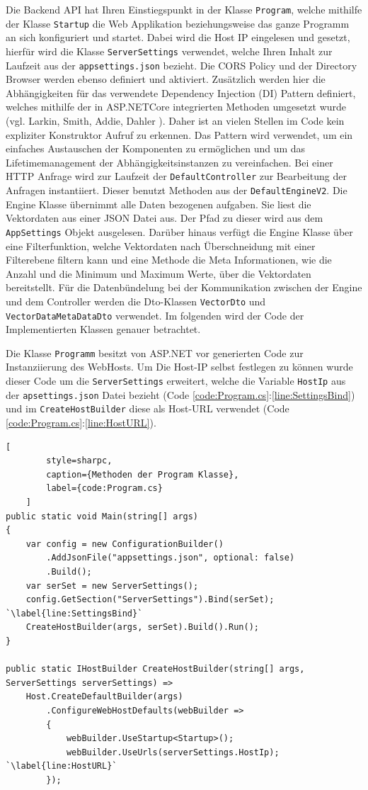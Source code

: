 Die Backend API hat Ihren Einstiegspunkt in der Klasse \texttt{Program}, welche mithilfe der Klasse \texttt{Startup} die Web Applikation beziehungsweise das ganze Programm an sich konfiguriert und startet. Dabei wird die Host IP eingelesen und gesetzt, hierfür wird die Klasse \texttt{ServerSettings} verwendet, welche Ihren Inhalt zur Laufzeit aus der \texttt{appsettings.json} bezieht. Die CORS Policy und der Directory Browser werden ebenso definiert und aktiviert. Zusätzlich werden hier die Abhängigkeiten für das verwendete Dependency Injection (DI) Pattern definiert, welches mithilfe der in ASP.NETCore integrierten Methoden umgesetzt wurde (vgl. Larkin, Smith, Addie, Dahler \cite{Dependen80:online}). Daher ist an vielen Stellen im Code kein expliziter Konstruktor Aufruf zu erkennen. Das Pattern wird verwendet, um ein einfaches Austauschen der Komponenten zu ermöglichen und um das Lifetimemanagement der Abhängigkeitsinstanzen zu vereinfachen. Bei einer HTTP Anfrage wird zur Laufzeit der \texttt{DefaultController} zur Bearbeitung der Anfragen instantiiert. Dieser benutzt Methoden aus der \texttt{DefaultEngineV2}. Die Engine Klasse übernimmt alle Daten bezogenen aufgaben. Sie liest die Vektordaten aus einer JSON Datei aus. Der Pfad zu dieser wird aus dem \texttt{AppSettings} Objekt ausgelesen. Darüber hinaus verfügt die Engine Klasse über eine Filterfunktion, welche Vektordaten nach Überschneidung mit einer Filterebene filtern kann und eine Methode die Meta Informationen, wie die Anzahl und die Minimum und Maximum Werte, über die Vektordaten bereitstellt. Für die Datenbündelung bei der Kommunikation zwischen der Engine und dem Controller werden die Dto-Klassen \texttt{VectorDto} und \texttt{VectorDataMetaDataDto} verwendet. Im folgenden wird der Code der Implementierten Klassen genauer betrachtet.

Die Klasse \texttt{Programm} besitzt von ASP.NET vor generierten Code zur Instanziierung
des WebHosts. Um Die Host-IP selbst festlegen zu können wurde dieser
Code um die \texttt{ServerSettings} erweitert, welche die Variable \texttt{HostIp} aus der
\texttt{apsettings.json} Datei bezieht
(Code \ref{code:Program.cs}:\ref{line:SettingsBind}) und im
\texttt{CreateHostBuilder} diese als Host-URL verwendet
(Code \ref{code:Program.cs}:\ref{line:HostURL}).

\begin{codeblock}
	\begin{lstlisting}[
		style=sharpc,
		caption={Methoden der Program Klasse},
		label={code:Program.cs}
	]
public static void Main(string[] args)
{
	var config = new ConfigurationBuilder()
		.AddJsonFile("appsettings.json", optional: false)
		.Build();
	var serSet = new ServerSettings();
	config.GetSection("ServerSettings").Bind(serSet); `\label{line:SettingsBind}`
	CreateHostBuilder(args, serSet).Build().Run();
}

public static IHostBuilder CreateHostBuilder(string[] args, ServerSettings serverSettings) =>
	Host.CreateDefaultBuilder(args)
		.ConfigureWebHostDefaults(webBuilder =>
		{
			webBuilder.UseStartup<Startup>();
			webBuilder.UseUrls(serverSettings.HostIp); `\label{line:HostURL}`
		});
	\end{lstlisting}
\end{codeblock}

